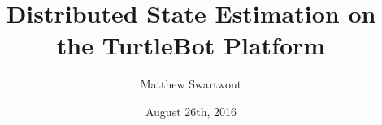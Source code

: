 \documentclass{beamer}
\title{Distributed State Estimation on the TurtleBot Platform}
\author{Matthew Swartwout}
\date{August 26th, 2016}
\begin{document}
\begin{frame}
    \titlepage
\end{frame}

\begin{frame}
\tableofcontents
\end{frame}
\end{document}

